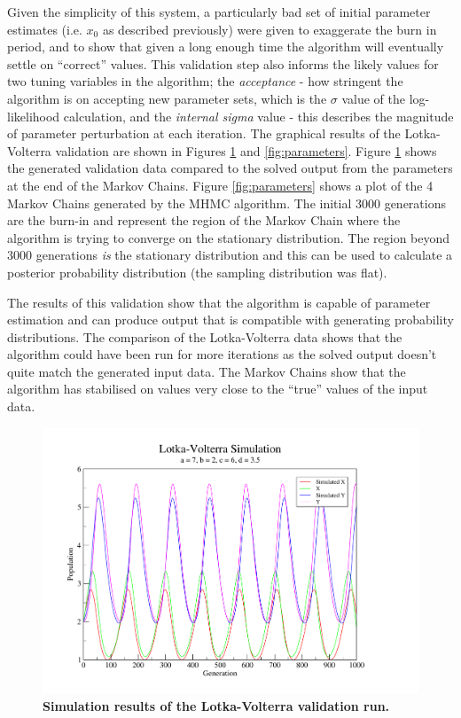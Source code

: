 Given the simplicity of this system, a particularly bad set of initial parameter estimates (i.e. $x_0$ as described previously) were given to exaggerate the burn in period, and to show that given a long enough time the algorithm will eventually settle on ``correct'' values. This validation step also informs the likely values for two tuning variables in the algorithm; the \textit{acceptance} - how stringent the algorithm is on accepting new parameter sets, which is the $\sigma$ value of the log-likelihood calculation, and the \textit{internal sigma} value - this describes the magnitude of parameter perturbation at each iteration.
The graphical results of the Lotka-Volterra validation are shown in Figures \ref{fig:simulation} and \ref{fig:parameters}. Figure \ref{fig:simulation} shows the generated validation data compared to the solved output from the parameters at the end of the Markov Chains. Figure \ref{fig:parameters} shows a plot of the 4 Markov Chains generated by the MHMC algorithm. The initial 3000 generations are the burn-in and represent the region of the Markov Chain where the algorithm is trying to converge on the stationary distribution. The region beyond 3000 generations \textit{is} the stationary distribution and this can be used to calculate a posterior probability distribution (the sampling distribution was flat).

The results of this validation show that the algorithm is capable of parameter estimation and can produce output that is compatible with generating probability distributions. The comparison of the Lotka-Volterra data shows that the algorithm could have been run for more iterations as the solved output doesn't quite match the generated input data. The Markov Chains show that the algorithm has stabilised on values very close to the ``true'' values of the input data.

\begin{figure}[tbp]
 \centering
 \includegraphics[width=13cm, trim=50px 35px 125px 30px, clip=true]{./03-parameterestimationmethodologies/data/LV_data.pdf}
 \caption[{Simulation results of the Lotka-Volterra validation run.}]{{\bf Simulation results of the Lotka-Volterra validation run.}
 \label{fig:simulation}}
\end{figure}

